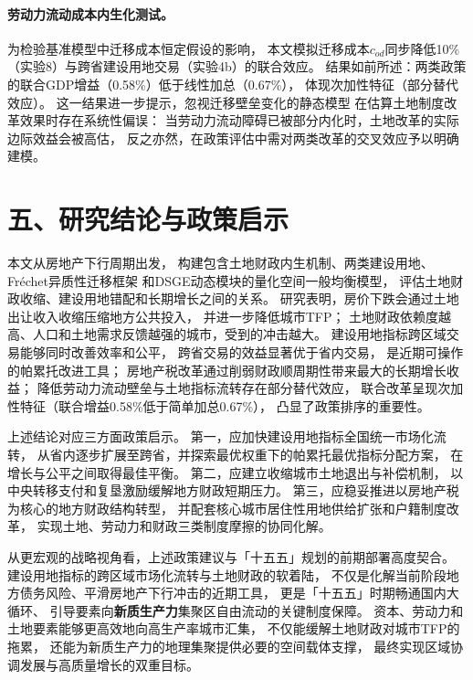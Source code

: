 \documentclass[UTF8,a4paper,12pt]{ctexart}
\theoremstyle{plain}
\theoremstyle{definition}
\theoremstyle{remark}
\begin{document}
\paragraph{劳动力流动成本内生化测试。}
为检验基准模型中迁移成本恒定假设的影响，
本文模拟迁移成本$c_{od}$同步降低10\%（实验8）与跨省建设用地交易（实验4b）的联合效应。
结果如前所述：两类政策的联合GDP增益（0.58\%）低于线性加总（0.67\%），
体现次加性特征（部分替代效应）。
这一结果进一步提示，忽视迁移壁垒变化的静态模型
在估算土地制度改革效果时存在系统性偏误：
当劳动力流动障碍已被部分内化时，土地改革的实际边际效益会被高估，
反之亦然，在政策评估中需对两类改革的交叉效应予以明确建模。

\section{五、研究结论与政策启示}

本文从房地产下行周期出发，
构建包含土地财政内生机制、两类建设用地、Fréchet异质性迁移框架
和DSGE动态模块的量化空间一般均衡模型，
评估土地财政收缩、建设用地错配和长期增长之间的关系。
研究表明，房价下跌会通过土地出让收入收缩压缩地方公共投入，
并进一步降低城市TFP；
土地财政依赖度越高、人口和土地需求反馈越强的城市，受到的冲击越大。
建设用地指标跨区域交易能够同时改善效率和公平，
跨省交易的效益显著优于省内交易，
是近期可操作的帕累托改进工具；
房地产税改革通过削弱财政顺周期性带来最大的长期增长收益；
降低劳动力流动壁垒与土地指标流转存在部分替代效应，
联合改革呈现次加性特征（联合增益0.58\%低于简单加总0.67\%），
凸显了政策排序的重要性。

上述结论对应三方面政策启示。
第一，应加快建设用地指标全国统一市场化流转，
从省内逐步扩展至跨省，并探索最优权重下的帕累托最优指标分配方案，
在增长与公平之间取得最佳平衡。
第二，应建立收缩城市土地退出与补偿机制，
以中央转移支付和复垦激励缓解地方财政短期压力。
第三，应稳妥推进以房地产税为核心的地方财政结构转型，
并配套核心城市居住性用地供给扩张和户籍制度改革，
实现土地、劳动力和财政三类制度摩擦的协同化解。

从更宏观的战略视角看，上述政策建议与「十五五」规划的前期部署高度契合。
建设用地指标的跨区域市场化流转与土地财政的软着陆，
不仅是化解当前阶段地方债务风险、平滑房地产下行冲击的近期工具，
更是「十五五」时期畅通国内大循环、
引导要素向\textbf{新质生产力}集聚区自由流动的关键制度保障。
资本、劳动力和土地要素能够更高效地向高生产率城市汇集，
不仅能缓解土地财政对城市TFP的拖累，
还能为新质生产力的地理集聚提供必要的空间载体支撑，
最终实现区域协调发展与高质量增长的双重目标。
\end{document}
